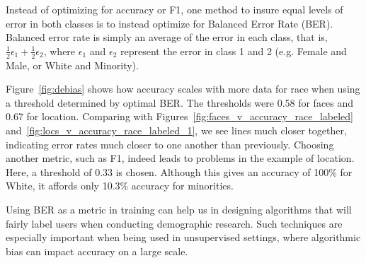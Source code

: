 Instead of optimizing for accuracy or F1, one method to insure equal levels of error in both classes is to instead optimize for Balanced Error Rate (BER).
Balanced error rate is simply an average of the error in each class, that is, 
$\frac{1}{2}\epsilon_1 + \frac{1}{2}\epsilon_2$, where $\epsilon_1$ and $\epsilon_2$ represent the error in class 1 and 2 (e.g. Female and Male, or White and Minority).

Figure~\ref{fig:debias} shows how accuracy scales with more data for race when using a threshold determined by optimal BER. 
The thresholds were 0.58 for faces and 0.67 for location.
Comparing with Figures~\ref{fig:faces_v_accuracy_race_labeled} and~\ref{fig:locs_v_accuracy_race_labeled_1}, we see lines much closer together, indicating error rates much closer to one another than previously.
Choosing another metric, such as F1, indeed leads to problems in the example of location.
Here, a threshold of 0.33 is chosen.
Although this gives an accuracy of 100\% for White, it affords only 10.3\% accuracy for minorities.

Using BER as a metric in training can help us in designing algorithms that will fairly label users when conducting demographic research.
Such techniques are especially important when being used in unsupervised settings, where algorithmic bias can impact accuracy on a large scale.









